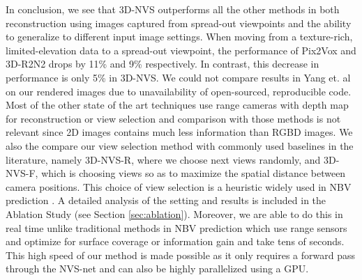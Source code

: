 In conclusion, we see that 3D-NVS outperforms all the other methods in both reconstruction using images captured from spread-out viewpoints and the ability to generalize to different input image settings. When moving from a texture-rich, limited-elevation data to a spread-out viewpoint, the performance of Pix2Vox and 3D-R2N2 drops by 11\% and 9\% respectively. In contrast, this decrease in performance is only 5\% in 3D-NVS. We could not compare results in Yang et. al on our rendered images due to unavailability of open-sourced, reproducible code. Most of the other state of the art techniques use range cameras with depth map for reconstruction or view selection and comparison with those methods is not relevant since 2D images contains much less information than RGBD images.
We also the compare our view selection method with commonly used baselines in the literature, namely 3D-NVS-R, where we choose next views randomly, and 3D-NVS-F, which is choosing views so as to maximize the spatial distance between camera positions. This choice of view selection is a heuristic widely used in NBV prediction \cite{shapenet,yang2018active,delmerico2018comparison, hashim2019next, ly2019autonomous}. A detailed analysis of the setting and results is included in the Ablation Study (see Section \ref{sec:ablation}). Moreover, we are able to do this in real time unlike traditional methods in NBV prediction which use range sensors and optimize for surface coverage or information gain and take tens of seconds. This high speed of our method is made possible as it only requires a forward pass through the NVS-net and can also be highly parallelized using a GPU.
